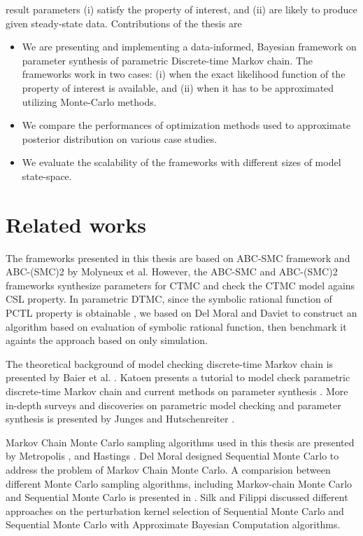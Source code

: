 result parameters (i) satisfy the property of interest, and (ii) are likely to produce given
steady-state data. Contributions of the thesis are
\begin{itemize}
      \item We are presenting and implementing a data-informed, Bayesian framework on parameter
            synthesis of parametric Discrete-time Markov chain. The frameworks work in two cases:
            (i) when the exact likelihood function of the property of interest is available, and
            (ii) when it has to be approximated utilizing Monte-Carlo methods.
      \item We compare the performances of optimization methods used to approximate posterior
            distribution on various case studies.
      \item We evaluate the scalability of the frameworks with different sizes of model state-space.
\end{itemize}

\section{Related works}
The frameworks presented in this thesis are based on ABC-SMC framework \cite{molyneux2019bayesian}
and ABC-(SMC)2 \cite{molyneux2020abc} by Molyneux et al. However, the ABC-SMC and ABC-(SMC)2
frameworks synthesize parameters for CTMC and check the CTMC model agains CSL property. In
parametric DTMC, since the symbolic rational function of PCTL property is obtainable
\cite{daws2004symbolic}, we based on Del Moral \cite{del2006sequential} and Daviet
\cite{daviet2018inference} to construct an algorithm based on evaluation of symbolic rational
function, then benchmark it againts the approach based on only simulation.

The theoretical background of model checking discrete-time Markov chain is presented by Baier et al.
\cite{baier2008principles}. Katoen \cite{katoen2016probabilistic} presents a tutorial to model check
parametric discrete-time Markov chain and current methods on parameter synthesis . More in-depth
surveys and discoveries on parametric model checking and parameter synthesis is presented by Junges
\cite{junges2020parameter} and Hutschenreiter \cite{hutschenreiter2017parametric}.

Markov Chain Monte Carlo sampling algorithms used in this thesis are presented by Metropolis
\cite{metropolis1953equation}, and Hastings \cite{hastings1970monte}. Del Moral
\cite{del2006sequential} designed Sequential Monte Carlo to address the problem of Markov Chain
Monte Carlo. A comparision between different Monte Carlo sampling algorithms, including Markov-chain
Monte Carlo and Sequential Monte Carlo is presented in \cite{daviet2018inference}. Silk
\cite{silk2012optimizing} and Filippi \cite{filippi2013optimality} discussed different approaches on
the perturbation kernel selection of Sequential Monte Carlo and Sequential Monte Carlo with
Approximate Bayesian Computation algorithms.

